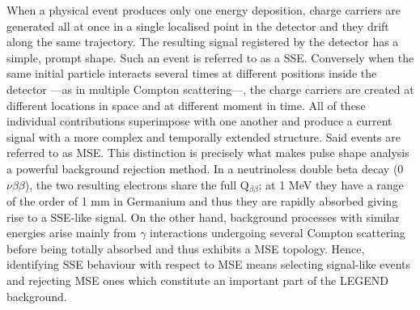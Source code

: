 When a physical event produces only one energy deposition, charge carriers are generated all at once in a single localised point in the detector and they drift along the same trajectory. The resulting signal registered by the detector has a simple, prompt shape. Such an event is referred to as a \ac{SSE}.
Conversely when the same initial particle interacts several times at different positions inside the detector ---as in multiple Compton scattering---, the charge carriers are created at different locations in space and at different moment in time. All of these individual contributions superimpose with one another and produce a current signal with a more complex and temporally extended structure. Said events are referred to as \ac{MSE}.
This distinction is precisely what makes pulse shape analysis a powerful background rejection method. In a neutrinoless double beta decay (0$\nu\beta\beta$), the two resulting electrons share the full Q$_{\beta\beta}$; at 1 MeV they have a range of the order of 1 mm in Germanium and thus they are rapidly absorbed giving rise to a \ac{SSE}-like signal. 
On the other hand, background processes with similar energies arise mainly from $\gamma$ interactions undergoing several Compton scattering before being totally absorbed and thus exhibits a \ac{MSE} topology. Hence, identifying \ac{SSE} behaviour with respect to \ac{MSE} means selecting signal-like events and rejecting \ac{MSE} ones which constitute an important part of the LEGEND background.

